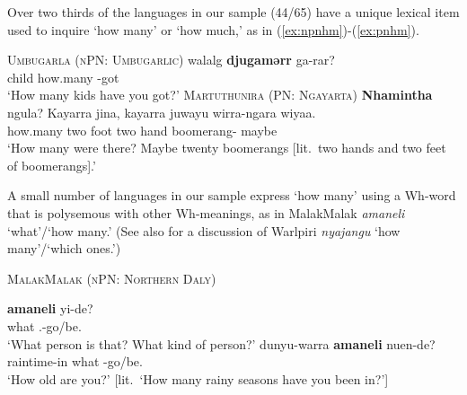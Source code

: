 \documentclass[12pt,egregdoesnotlikesansseriftitles]{scrartcl}
\makeatletter
\newcommand{\ofy}{/125} %
\makeatother
\begin{document}
Over two thirds of the languages in our sample (44/65) have a unique lexical item used to inquire `how many' or `how much,' as in (\ref{ex:npnhm})-(\ref{ex:pnhm}). %


\begin{exe}
  \ex\label{ex:npnhm}\textsc{Umbugarla (nPN: Umbugarlic)}\hfill {}
  \gll walalg \textbf{djugamərr} ga-rar?\\
  child how.many \Ssg-got\\
  \glt `How many kids have you got?'
  \ex\label{ex:pnhm}\textsc{Martuthunira (PN: Ngayarta)}\hfill {}
  \gll \textbf{Nhamintha} ngula? Kayarra jina, kayarra juwayu wirra-ngara wiyaa.\\
  how.many \Ignor{} two foot two hand boomerang-\Pl{} maybe\\
  \glt `How many were there? Maybe twenty boomerangs [lit.\ two hands and two feet of boomerangs].'
\end{exe}


A small number of languages in our sample express `how many' using a Wh-word that is polysemous with other Wh-meanings, as in MalakMalak \textit{amaneli} `what'/`how many.' (See also  \citealt[15-16]{bittnerhale95} for a discussion of Warlpiri \textit{nyajangu} `how many'/`which ones.')

\begin{exe}
  \ex\label{ex:whathm}\textsc{MalakMalak (nPN: Northern Daly)}\hfill {}
  \begin{xlist}
    \ex\gll \textbf{amaneli} yi-de?\\
    what \Tsg.\M-go/be.\Prs\\
    \glt `What person is that? What kind of person?'
    \ex\gll dunyu-warra \textbf{amaneli} nuen-de?\\
    raintime-in what \Ssg-go/be.\Prs\\
    \glt `How old are you?' [lit.\ `How many rainy seasons have you been in?']
    
    
  \end{xlist}
 \end{exe}
 
\end{document}

